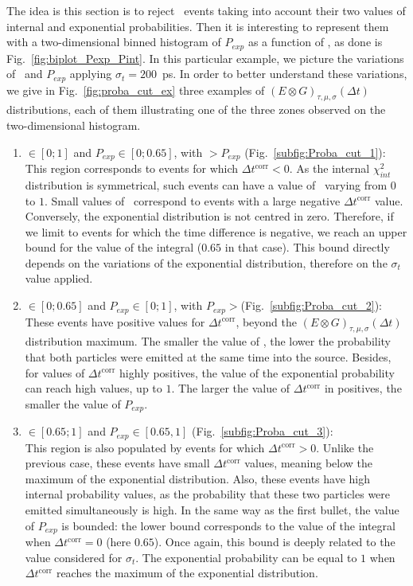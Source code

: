 The idea is this section is to reject \Tl\ events taking into account their two values of internal and exponential probabilities.
Then it is interesting to represent them with a two-dimensional binned histogram of $P_{exp}$ as a function of \Pint, as done is Fig.~\ref{fig:biplot_Pexp_Pint}.
In this particular example, we picture the variations of \Pint\ and $P_{exp}$ applying ${\sigma_{t}=200}$~ps.
In order to better understand these variations, we give in Fig.~\ref{fig:proba_cut_ex} three examples of ${(E \otimes G)_{\tau,\mu,\sigma}(\Delta t)}$ distributions, each of them illustrating one of the three zones observed on the two-dimensional histogram.
\begin{enumerate}
\item \Pint$\in[0;1]$ and $P_{exp}\in[0;0.65]$, with \Pint$>P_{exp}$ (Fig.~\ref{subfig:Proba_cut_1}):\\
  This region corresponds to events for which $\Delta t^{\text{corr}}<0$.
  As the internal $\chi^{2}_{int}$ distribution is symmetrical, such events can have a value of \Pint\ varying from $0$ to $1$.
  Small values of \Pint\ correspond to events with a large negative $\Delta t^{\text{corr}}$ value.
  Conversely, the exponential distribution is not centred in zero.
  Therefore, if we limit to events for which the time difference is negative, we reach an upper bound for the value of the integral ($0.65$ in that case).
  This bound directly depends on the variations of the exponential distribution, therefore on the $\sigma_{t}$ value applied.
\item \Pint$\in[0;0.65]$ and $P_{exp}\in[0;1]$, with $P_{exp}>$\Pint (Fig.~\ref{subfig:Proba_cut_2}):\\
  These events have positive values for $\Delta t^{\text{corr}}$, beyond the ${(E \otimes G)_{\tau,\mu,\sigma}(\Delta t)}$ distribution maximum.
  The smaller the value of \Pint, the lower the probability that both particles were emitted at the same time into the source.
  Besides, for values of $\Delta t^{\text{corr}}$ highly positives, the value of the exponential probability can reach high values, up to $1$.
  The larger the value of $\Delta t^{\text{corr}}$ in positives, the smaller the value of $P_{exp}$.
\item \Pint$\in[0.65;1]$ and $P_{exp}\in[0.65,1]$ (Fig.~\ref{subfig:Proba_cut_3}):\\
  This region is also populated by events for which $\Delta t^{\text{corr}}>0$.
  Unlike the previous case, these events have small $\Delta t^{\text{corr}}$ values, meaning below the maximum of the exponential distribution.
  Also, these events have high internal probability values, as the probability that these two particles were emitted simultaneously is high.
  In the same way as the first bullet, the value of $P_{exp}$ is bounded: the lower bound corresponds to the value of the integral when $\Delta t^{\text{corr}}=0$ (here $0.65$).
  Once again, this bound is deeply related to the value considered for $\sigma_{t}$.
  The exponential probability can be equal to $1$ when $\Delta t^{\text{corr}}$ reaches the maximum of the exponential distribution.
\end{enumerate}
